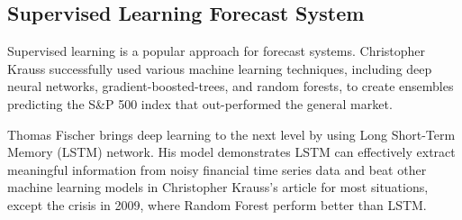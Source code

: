 \subsection{Supervised Learning Forecast System}
Supervised learning is a popular approach for forecast systems. Christopher Krauss successfully used various machine learning techniques, including deep neural networks, gradient-boosted-trees, and random forests, to create ensembles predicting the S\&P 500 index that out-performed the general market\cite{KRAUSS2017689}.
\par

Thomas Fischer brings deep learning to the next level by using Long Short-Term Memory (LSTM) network\cite{FISCHER2018654}. His model demonstrates LSTM can effectively extract meaningful information from noisy financial time series data and beat other machine learning models in  Christopher Krauss's article  \cite{KRAUSS2017689} for most situations, except the crisis in 2009, where Random Forest perform better than LSTM.